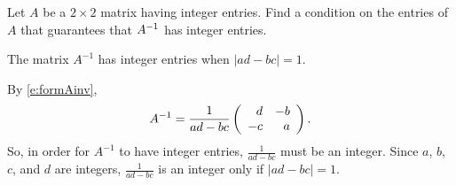 \documentclass{ximera}
\begin{document}
\begin{exercise} \label{c4.9.5}
Let $A$ be a $2\times 2$ matrix having integer entries.  Find a
condition on the entries of $A$ that guarantees that $A^{-1}$ has
integer entries.

\begin{solution}

\ans The matrix $A^{-1}$ has integer entries when $|ad - bc| = 1$.

\soln By \eqref{e:formAinv},
\[
A^{-1} = \frac{1}{ad-bc}\left(\begin{array}{rr} d & -b\\ -c &a\end{array}\right).
\]
So, in order for $A^{-1}$ to have integer entries, $\frac{1}{ad-bc}$
must be an integer.  Since $a$, $b$, $c$, and $d$ are integers,
$\frac{1}{ad - bc}$ is an integer only if $|ad - bc| = 1$.


\end{solution}
\end{exercise}
\end{document}
